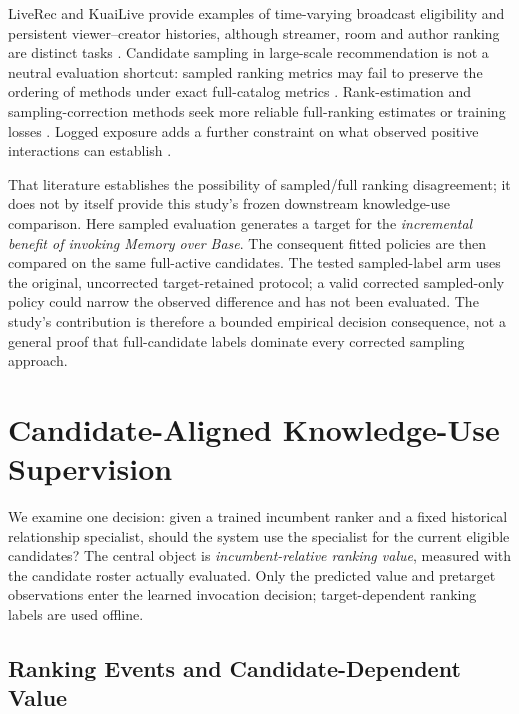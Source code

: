 \documentclass[preprint,12pt]{elsarticle}
\begin{document}
LiveRec and KuaiLive provide examples of time-varying broadcast eligibility and persistent viewer--creator histories, although streamer, room and author ranking are distinct tasks \cite{rappaz2021liverec,qu2026kuailive}. Candidate sampling in large-scale recommendation is not a neutral evaluation shortcut: sampled ranking metrics may fail to preserve the ordering of methods under exact full-catalog metrics \cite{krichene2020kdd}. Rank-estimation and sampling-correction methods seek more reliable full-ranking estimates or training losses \cite{jin2021sampledeval,li2023reliable,li2024itemsampling,subbiah2024rankestimation}. Logged exposure adds a further constraint on what observed positive interactions can establish \cite{pereira2025samplingreliability}.

That literature establishes the possibility of sampled/full ranking disagreement; it does not by itself provide this study's frozen downstream knowledge-use comparison. Here sampled evaluation generates a target for the \emph{incremental benefit of invoking Memory over Base}. The consequent fitted policies are then compared on the same full-active candidates. The tested sampled-label arm uses the original, uncorrected target-retained protocol; a valid corrected sampled-only policy could narrow the observed difference and has not been evaluated. The study's contribution is therefore a bounded empirical decision consequence, not a general proof that full-candidate labels dominate every corrected sampling approach.

\section{Candidate-Aligned Knowledge-Use Supervision}
\label{sec:problem}
\label{sec:framework}

We examine one decision: given a trained incumbent ranker and a fixed historical relationship specialist, should the system use the specialist for the current eligible candidates? The central object is \emph{incumbent-relative ranking value}, measured with the candidate roster actually evaluated. Only the predicted value and pretarget observations enter the learned invocation decision; target-dependent ranking labels are used offline.

\subsection{Ranking Events and Candidate-Dependent Value}
\label{sec:event-utility}
\end{document}
